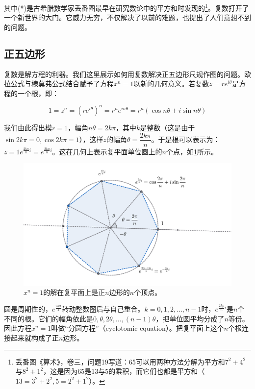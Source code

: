 \documentclass[b5paper]{ctexart}
\begin{document}
其中(*)是古希腊数学家丢番图最早在研究数论中的平方和时发现的\footnote{丢番图《算术》，卷三，问题19写道：65可以用两种方法分解为平方和$7^2 + 4^2$与$8^2 + 1^2$，这是因为65是13与5的乘积，而它们也都是平方和（$13 = 3^2 + 2^2, 5 = 2^2 + 1^2$）。}。复数打开了一个新世界的大门。它威力无穷，不仅解决了以前的难题，也提出了人们意想不到的问题。

\subsection{正五边形}
\label{sec:pentagon-equation}

复数是解方程的利器。我们这里展示如何用复数解决正五边形尺规作图的问题。欧拉公式与棣莫弗公式结合赋予了方程$x^n = 1$以新的几何意义。若复数$z = re^{i\theta}$是方程的一个根，即：

\[
1 = z^n = (re^{i\theta})^n = r^ne^{in\theta} = r^n(\cos n\theta + i\sin n\theta)
\]

我们由此得出模$r = 1$，幅角$n\theta = 2k\pi$，其中$k$是整数（这是由于$\sin 2k\pi = 0, \cos 2k\pi = 1$），这样$z$的幅角$\theta = \dfrac{2k\pi}{n}$。于是根可以表示为：$z = 1e^{\frac{2k\pi}{n}i} = e^{\frac{2k\pi}{n}i}$。这在几何上表示复平面单位圆上的$n$个点，如\cref{fig:heptagon-z}所示。

\begin{figure}[htbp]
  \centering
  \includegraphics[scale=0.33]{img/heptagon-z}
  \caption{$x^n = 1$的解在复平面上是正$n$边形的$n$个顶点。}
 \label{fig:heptagon-z}
\end{figure}

圆是周期性的，$e^{\frac{2k\pi}{2}}$转动整数圈后与自己重合。$k = 0, 1, 2, \dotsc, n-1$时，$e^{\frac{2kp}{n}i}$是$n$个不同的根。它们的幅角依此是$0, \theta, 2\theta, \dotsc, (n-1)\theta$，把单位圆平均分成了$n$等份。因此方程$x^n = 1$叫做“分圆方程”（cyclotomic equation）。把复平面上这个$n$个根连接起来就构成了正$n$边形。
\end{document}
